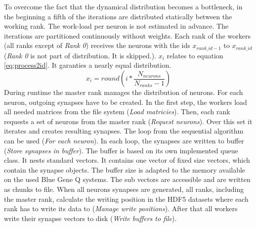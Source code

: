 To overcome the fact that the dynamical distribution becomes a bottleneck, in the beginning a fifth of the iterations are distributed
statically between the working rank.
The work-load per neuron is not estimated in advance.
The iterations are partitioned continuously without weights.
Each rank of the workers (all ranks except of \emph{Rank 0}) receives the neurons with the ids $x_{rank\_id-1}$
to $x_{rank\_id}$ (\emph{Rank 0} is not part of distribution. It is skipped.).
$x_i$ relates to equation \ref{eq:process2id}. It garanties a nearly equal distribution.
\begin{equation}
	x_i = round(i * \frac{N_{neurons}}{N_{ranks}-1})
	\label{eq:process2id}
\end{equation}
During runtime the master rank manages the distribution of neurons. For each neuron, 
outgoing synapses have to be created. In the first step, the workers load all needed matrices from the file system (\emph{Load matricies}).
Then, each rank requests a set of neurons from the master rank (\emph{Request neurons}). Over this set it iterates and creates resulting
synapses. The loop from the sequential algorithm can be used (\emph{For each neuron}).
In each loop, the synapses are written to buffer (\emph{Store synapses in buffer}).
The buffer is based on its own implemented queue class. It nests standard vectors.
It contains one vector of fixed size vectors, which contain the synapse objects.
The buffer size is adapted to 
the memory available on the used Blue Gene Q systems.
The sub vectors are accessible and are written as chunks to file.
When all neurons synapses are generated, all ranks, including the master rank, calculate the writing position
in the HDF5 datasets where each rank has to write its data to (\emph{Manage write positions}). After that all workers write their synapse vectors to
disk (\emph{Write buffers to file}).




